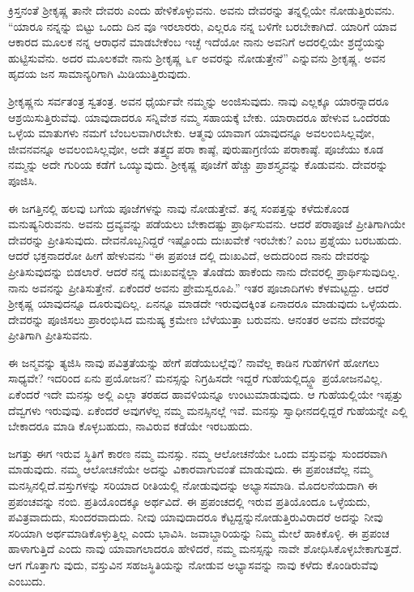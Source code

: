 ಕ್ರಿಸ್ತನಂತೆ ಶ‍್ರೀಕೃಷ್ಣ ತಾನೇ ದೇವರು ಎಂದು ಹೇಳಿಕೊಳ್ಳುವನು. ಅವನು ದೇವರನ್ನು ತನ್ನಲ್ಲಿಯೇ ನೋಡುತ್ತಿರುವನು. “ಯಾರೂ ನನ್ನನ್ನು ಬಿಟ್ಟು ಒಂದು ದಿನ ವೂ ಇರಲಾರರು, ಎಲ್ಲರೂ ನನ್ನ ಬಳಿಗೇ ಬರಬೇಕಾಗಿದೆ. ಯಾರಿಗೆ ಯಾವ ಆಕಾರದ ಮೂಲಕ ನನ್ನ ಆರಾಧನೆ ಮಾಡಬೇಕೆಂಬ ಇಚ್ಛೆ ಇದೆಯೋ ನಾನು ಅವನಿಗೆ ಅದರಲ್ಲಿಯೇ ಶ್ರದ್ಧೆಯನ್ನು ಹುಟ್ಟಿಸುವೆನು. ಅದರ ಮೂಲಕವೇ ನಾನು ಶ‍್ರೀಕೃಷ್ಣ ೬೯ ಅವರನ್ನು ನೋಡುತ್ತೇನೆ” ಎನ್ನುವನು ಶ‍್ರೀಕೃಷ್ಣ. ಅವನ ಹೃದಯ ಜನ ಸಾಮಾನ್ಯರಿಗಾಗಿ ಮಿಡಿಯುತ್ತಿರುವುದು.

ಶ‍್ರೀಕೃಷ್ಣನು ಸರ್ವತಂತ್ರ ಸ್ವತಂತ್ರ. ಅವನ ಧೈರ್ಯವೇ ನಮ್ಮನ್ನು ಅಂಜಿಸುವುದು. ನಾವು ಎಲ್ಲಕ್ಕೂ ಯಾರನ್ನಾದರೂ ಆಶ್ರಯಿಸುತ್ತಿರುವೆವು. ಯಾವುದಾದರೂ ಸನ್ನಿವೇಶ ನಮ್ಮ ಸಹಾಯಕ್ಕೆ ಬೇಕು. ಯಾರಾದರೂ ಹೇಳುವ ಒಂದೆರಡು ಒಳ್ಳೆಯ ಮಾತುಗಳು ನಮಗೆ ಬೆಂಬಲವಾಗಿರಬೇಕು. ಆತ್ಮವು ಯಾವಾಗ ಯಾವುದನ್ನೂ ಅವಲಂಬಿಸಿಲ್ಲವೋ, ಜೀವನವನ್ನೂ ಅವಲಂಬಿಸಿಲ್ಲವೋ, ಅದೇ ತತ್ತ್ವದ ಪರಾ ಕಾಷ್ಠೆ, ಪುರುಷಾಗ್ರಣಿಯ ಪರಾಕಾಷ್ಠೆ. ಪೂಜೆಯು ಕೂಡ ನಮ್ಮನ್ನು ಅದೇ ಗುರಿಯ ಕಡೆಗೆ ಒಯ್ಯುವುದು. ಶ‍್ರೀಕೃಷ್ಣ ಪೂಜೆಗೆ ಹೆಚ್ಚು ಪ್ರಾಶಸ್ತ್ಯವನ್ನು ಕೊಡುವನು. ದೇವರನ್ನು ಪೂಜಿಸಿ.

ಈ ಜಗತ್ತಿನಲ್ಲಿ ಹಲವು ಬಗೆಯ ಪೂಜೆಗಳನ್ನು ನಾವು ನೋಡುತ್ತೇವೆ. ತನ್ನ ಸಂಪತ್ತನ್ನು ಕಳೆದುಕೊಂಡ ಮನುಷ್ಯನಿರುವನು. ಅವನು ದ್ರವ್ಯವನ್ನು ಪಡೆಯಲು ಬೇಕಾದಷ್ಟು ಪ್ರಾರ್ಥಿಸುವನು. ಆದರೆ ಪರಾಪೂಜೆ ಪ್ರೀತಿಗಾಗಿಯೇ ದೇವರನ್ನು ಪ್ರೀತಿಸುವುದು. ದೇವನೊಬ್ಬನಿದ್ದರೆ ಇಷ್ಟೊಂದು ದುಃಖವೇಕೆ ಇರಬೇಕು? ಎಂಬ ಪ್ರಶ್ನೆಯು ಬರಬಹುದು. ಆದರೆ ಭಕ್ತನಾದರೋ ಹೀಗೆ ಹೇಳುವನು “ಈ ಪ್ರಪಂಚ ದಲ್ಲಿ ದುಃಖವಿದೆ, ಅದುದರಿಂದ ನಾನು ದೇವರನ್ನು ಪ್ರೀತಿಸುವುದನ್ನು ಬಿಡಲಾರೆ. ಆದರೆ ನನ್ನ ದುಃಖವನ್ನೆಲ್ಲಾ ತೊಡೆದು ಹಾಕೆಂದು ನಾನು ದೇವರಲ್ಲಿ ಪ್ರಾರ್ಥಿಸುವುದಿಲ್ಲ. ನಾನು ಅವನನ್ನು ಪ್ರೀತಿಸುತ್ತೇನೆ. ಏಕೆಂದರೆ ಅವನು ಪ್ರೇಮಸ್ವರೂಪಿ.” ಇತರ ಪೂಜಾದಿಗಳು ಕೆಳಮಟ್ಟದ್ದು. ಆದರೆ ಶ‍್ರೀಕೃಷ್ಣ ಯಾವುದನ್ನೂ ದೂರುವುದಿಲ್ಲ. ಏನನ್ನೂ ಮಾಡದೇ ಇರುವುದಕ್ಕಿಂತ ಏನಾದರೂ ಮಾಡುವುದು ಒಳ್ಳೆಯದು. ದೇವರನ್ನು ಪೂಜಿಸಲು ಪ್ರಾರಂಭಿಸಿದ ಮನುಷ್ಯ ಕ್ರಮೇಣ ಬೆಳೆಯುತ್ತಾ ಬರುವನು. ಆನಂತರ ಅವನು ದೇವರನ್ನು ಪ್ರೀತಿಗಾಗಿ ಪ್ರೀತಿಸುವನು.

ಈ ಜನ್ಮವನ್ನು ತ್ಯಜಿಸಿ ನಾವು ಪವಿತ್ರತೆಯನ್ನು ಹೇಗೆ ಪಡೆಯಬಲ್ಲೆವು? ನಾವೆಲ್ಲ ಕಾಡಿನ ಗುಹೆಗಳಿಗೆ ಹೋಗಲು ಸಾಧ್ಯವೇ? ಇದರಿಂದ ಏನು ಪ್ರಯೋಜನ? ಮನಸ್ಸನ್ನು ನಿಗ್ರಹಿಸದೇ ಇದ್ದರೆ ಗುಹೆಯಲ್ಲಿದ್ದ್ದೂ ಪ್ರಯೋಜನವಿಲ್ಲ. ಏಕೆಂದರೆ ಇದೇ ಮನಸ್ಸು ಅಲ್ಲಿ ಎಲ್ಲಾ ತರಹದ ಹಾವಳಿಯನ್ನೂ ಉಂಟುಮಾಡುವುದು. ಆ ಗುಹೆಯಲ್ಲಿಯೇ ಇಪ್ಪತ್ತು ದೆವ್ವಗಳು ಇರುವುವು. ಏಕೆಂದರೆ ಅವುಗಳೆಲ್ಲ ನಮ್ಮ ಮನಸ್ಸಿನಲ್ಲೆ ಇವೆ. ಮನಸ್ಸು ಸ್ವಾಧೀನದಲ್ಲಿದ್ದರೆ ಗುಹೆಯನ್ನೇ ಎಲ್ಲಿ ಬೇಕಾದರೂ ಮಾಡಿ ಕೊಳ್ಳಬಹುದು, ನಾವಿರುವ ಕಡೆಯೇ ಇರಬಹುದು.

ಜಗತ್ತು ಈಗ ಇರುವ ಸ್ಥಿತಿಗೆ ಕಾರಣ ನಮ್ಮ ಮನಸ್ಸು. ನಮ್ಮ ಆಲೋಚನೆಯೇ ಒಂದು ವಸ್ತುವನ್ನು ಸುಂದರವಾಗಿ ಮಾಡುವುದು. ನಮ್ಮ ಆಲೋಚನೆಯೇ ಅದನ್ನು ವಿಕಾರವಾಗುವಂತೆ ಮಾಡುವುದು. ಈ ಪ್ರಪಂಚವೆಲ್ಲ ನಮ್ಮ ಮನಸ್ಸಿನಲ್ಲಿದೆ.ವಸ್ತುಗಳನ್ನು ಸರಿಯಾದ ರೀತಿಯಲ್ಲಿ ನೋಡುವುದನ್ನು ಅಭ್ಯಾಸಮಾಡಿ. ಮೊದಲನೆಯದಾಗಿ ಈ ಪ್ರಪಂಚವನ್ನು ನಂಬಿ. ಪ್ರತಿಯೊಂದಕ್ಕೂ ಅರ್ಥವಿದೆ. ಈ ಪ್ರಪಂಚದಲ್ಲಿ ಇರುವ ಪ್ರತಿಯೊಂದೂ ಒಳ್ಳೆಯದು, ಪವಿತ್ರವಾದುದು, ಸುಂದರವಾದುದು. ನೀವು ಯಾವುದಾದರೂ ಕೆಟ್ಟದ್ದನ್ನು\break ನೋಡುತ್ತಿರುವಿರಾದರೆ ಅದನ್ನು ನೀವು ಸರಿಯಾಗಿ ಅರ್ಥಮಾಡಿಕೊಳ್ಳುತ್ತಿಲ್ಲ ಎಂದು ಭಾವಿಸಿ. ಜವಾಬ್ದಾರಿಯನ್ನು ನಿಮ್ಮ ಮೇಲೆ ಹಾಕಿಕೊಳ್ಳಿ. ಈ ಪ್ರಪಂಚ ಹಾಳಾಗುತ್ತಿದೆ ಎಂದು ನಾವು ಯಾವಾಗಲಾದರೂ ಹೇಳಿದರೆ, ನಮ್ಮ ಮನಸ್ಸನ್ನು ನಾವೇ ಶೋಧಿಸಿಕೊಳ್ಳಬೇಕಾಗುತ್ತದೆ. ಆಗ ಗೊತ್ತಾಗು ವುದು, ವಸ್ತುವಿನ ಸಹಜಸ್ಥಿತಿಯನ್ನು ನೋಡುವ ಅಭ್ಯಾಸವನ್ನು ನಾವು ಕಳೆದು ಕೊಂಡಿರುವೆವು ಎಂಬುದು.

